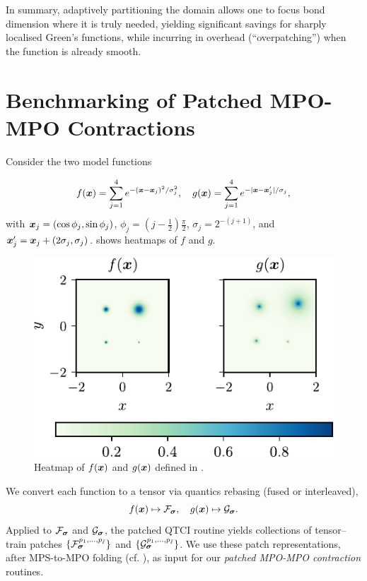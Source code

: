In summary, adaptively partitioning the domain allows one to focus bond dimension where it is truly needed, yielding significant savings for sharply localised Green’s functions, while incurring in overhead (``overpatching'') when the function is already smooth.

\section{Benchmarking of Patched MPO-MPO Contractions}
\label{sec:benchmarkMPOMPOContr}
Consider the two model functions 

\begin{align}
f(\boldsymbol{x}) = \sum_{j=1}^4 e^{-(\boldsymbol{x} - \boldsymbol{x}_j)^2/\sigma^2_j}, \quad  
g(\boldsymbol{x}) = \sum_{j=1}^4 e^{-|\boldsymbol{x} - \boldsymbol{x}'_j|/\sigma_j}, 
\label{eq:linearGauss}
\end{align}
with $\boldsymbol{x}_j = (\cos \phi_j, \sin \phi_j )$, $\phi_j = (j-\frac{1}{2}) \frac{\pi}{2}$, $\sigma_j =  2^{-(j+1)}$, and $\boldsymbol{x}'_j =\boldsymbol{x}_j + (2\sigma_j,
\sigma_j)$.  shows heatmaps of \(f\) and \(g\).

\begin{figure}[htbp]
    \centering
    \includegraphics{figures/linearCombGauss.pdf}
    \caption{Heatmap of $f(\boldsymbol{x})$ and $g(\boldsymbol{x})$ defined in .}
    \label{fig:factorsHeatmaps}
\end{figure}

We convert each function to a tensor via quantics rebasing (fused or interleaved),
\begin{equation}
    f(\boldsymbol{x}) \mapsto \mathcal{F}_{\boldsymbol{\sigma}}, \quad g(\boldsymbol{x}) \mapsto \mathcal{G}_{\boldsymbol{\sigma}}.
    \label{eq:tensorFactors}
\end{equation}
Applied to \(\mathcal{F}_{\boldsymbol{\sigma}}\) and \(\mathcal{G}_{\boldsymbol{\sigma}}\), the patched QTCI routine yields collections of tensor–train patches \(\{\mathcal{F}^{p_{1},\dots,p_{\bar\ell}}_{\boldsymbol{\sigma}}\}\) and \(\{\mathcal{G}^{p_{1},\dots,p_{\bar\ell}}_{\boldsymbol{\sigma}}\}\). We use these patch representations, after MPS-to-MPO folding (cf. ), as input for our \textit{patched MPO-MPO contraction} routines.

